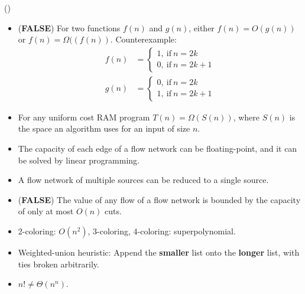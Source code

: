 \item \begin{theorem}{()} \quad\quad
    \begin{itemize}
        \item (\textbf{FALSE}) For two functions $f(n)$ and $g(n)$, either $f(n) = O(g(n))$ or $f(n) = \Omega((f(n))$.
        Counterexample:\begin{equation}
            \begin{aligned}
                f(n) & = \begin{cases}
                    1, \ \text{if} \ n = 2k \\
                    0, \ \text{if} \ n = 2k + 1
                \end{cases} \\
                g(n) & = \begin{cases}
                    0, \ \text{if} \ n = 2k \\
                    1, \ \text{if} \ n = 2k + 1
                \end{cases} 
            \end{aligned}
        \end{equation}
        \item For any uniform cost RAM program $T(n) = \Omega(S(n))$, where $S(n)$ is the space an algorithm uses for an input of size $n$.
        \item The capacity of each edge of a flow network can be floating-point, and it can be solved by linear programming.
        \item A flow network of multiple sources can be reduced to a single source.
        \item (\textbf{FALSE}) The value of any flow of a flow network is bounded by the capacity of only at most $O(n)$ cuts.
        \item 2-coloring: $O(n^2)$, 3-coloring, 4-coloring: superpolynomial.
        \item Weighted-union heuristic: Append the \textbf{smaller} list onto the \textbf{longer} list, with ties broken arbitrarily.
        \item $n! \neq \Theta(n^n)$.
    \end{itemize}
\end{theorem}
